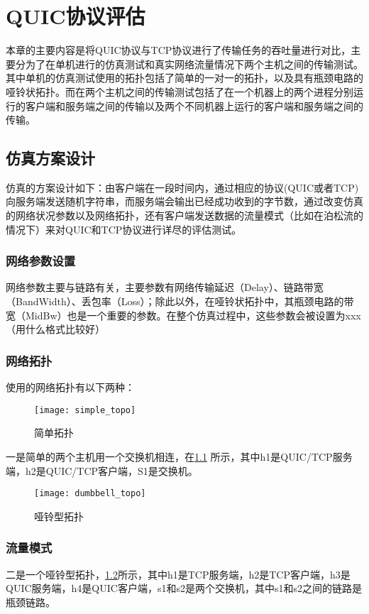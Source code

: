 \chapter{QUIC协议评估}
本章的主要内容是将QUIC协议与TCP协议进行了传输任务的吞吐量进行对比，主要分为了在单机进行的仿真测试和真实网络流量情况下两个主机之间的传输测试。其中单机的仿真测试使用的拓扑包括了简单的一对一的拓扑，以及具有瓶颈电路的哑铃状拓扑。而在两个主机之间的传输测试包括了在一个机器上的两个进程分别运行的客户端和服务端之间的传输以及两个不同机器上运行的客户端和服务端之间的传输。

\section{仿真方案设计}
仿真的方案设计如下：由客户端在一段时间内，通过相应的协议(QUIC或者TCP)向服务端发送随机字符串，而服务端会输出已经成功收到的字节数，通过改变仿真的网络状况参数以及网络拓扑，还有客户端发送数据的流量模式（比如在泊松流的情况下）来对QUIC和TCP协议进行详尽的评估测试。
\subsection{网络参数设置}
网络参数主要与链路有关，主要参数有网络传输延迟（Delay）、链路带宽（BandWidth）、丢包率（Loss）；除此以外，在哑铃状拓扑中，其瓶颈电路的带宽（MidBw）也是一个重要的参数。在整个仿真过程中，这些参数会被设置为xxx（用什么格式比较好）

\subsection{网络拓扑}
使用的网络拓扑有以下两种：
\begin{figure}
	\centering
	\texttt{[image: simple\_topo]}
	\caption{简单拓扑}
	\label{fig:simpletopo}
\end{figure}
一是简单的两个主机用一个交换机相连，在\ref{fig:simpletopo} 所示，其中h1是QUIC/TCP服务端，h2是QUIC/TCP客户端，S1是交换机。

\begin{figure}
	\centering
	\texttt{[image: dumbbell\_topo]}
	\caption{哑铃型拓扑}
	\label{fig:dumbbelltopo}
\end{figure}
\subsection{流量模式}
二是一个哑铃型拓扑，\ref{fig:dumbbelltopo}所示，其中h1是TCP服务端，h2是TCP客户端，h3是QUIC服务端，h4是QUIC客户端，s1和s2是两个交换机，其中s1和s2之间的链路是瓶颈链路。

